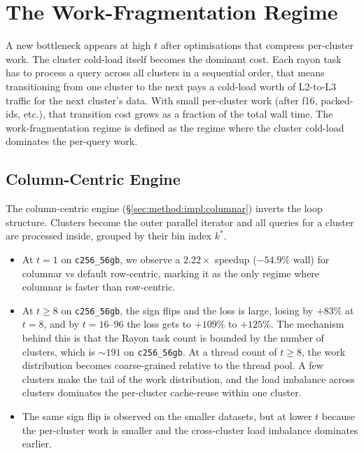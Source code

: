 \section{The Work-Fragmentation Regime\label{sec:exp:wf}}

A new bottleneck appears at high $t$ after optimisations that compress per-cluster work. The cluster cold-load itself becomes the dominant cost. Each rayon task has to process a query across all clusters in a sequential order, that means transitioning from one cluster to the next pays a cold-load worth of L2-to-L3 traffic for the next cluster's data. With small per-cluster work (after f16, packed-ids, etc.), that transition cost grows as a fraction of the total wall time. The work-fragmentation regime is defined as the regime where the cluster cold-load dominates the per-query work.

\subsection{Column-Centric Engine\label{sec:exp:wf:columnar}}

The column-centric engine (§\ref{sec:method:impl:columnar}) inverts the loop structure. Clusters become the outer parallel iterator and all queries for a cluster are processed inside, grouped by their bin index $k^*$.

\begin{itemize}
  \item At $t=1$ on \texttt{c256\_56gb}, we observe a $2.22\times$ speedup ($-54.9\%$ wall) for columnar vs default row-centric, marking it as the only regime where columnar is faster than row-centric.
  \item At $t \geq 8$ on \texttt{c256\_56gb}, the sign flips and the loss is large, losing by $+83\%$ at $t=8$, and by $t=16$--$96$ the loss gets to $+109\%$ to $+125\%$. The mechanism behind this is that the Rayon task count is bounded by the number of clusters, which is ${\sim}191$ on \texttt{c256\_56gb}. At a thread count of $t \geq 8$, the work distribution becomes coarse-grained relative to the thread pool. A few clusters make the tail of the work distribution, and the load imbalance across clusters dominates the per-cluster cache-reuse within one cluster.
  \item The same sign flip is observed on the smaller datasets, but at lower $t$ because the per-cluster work is smaller and the cross-cluster load imbalance dominates earlier.
\end{itemize}

